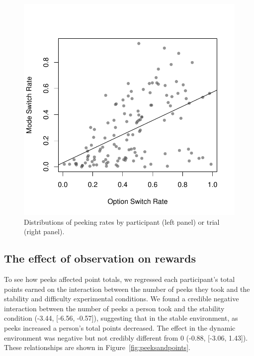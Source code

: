 \documentclass[a4paper,doc,natbib,floatsintext]{apa6}\usepackage[]{graphicx}\usepackage[]{color}
\makeatletter
\def\maxwidth{ %
  \ifdim\Gin@nat@width>\linewidth
    \linewidth
  \else
    \Gin@nat@width
  \fi
}
\newenvironment{knitrout}{}{} %
\makeatother
\begin{document}
\begin{figure}
\centering
\begin{knitrout}
\color{fgcolor}
\includegraphics[width=\maxwidth]{figure/unnamed-chunk-18-1} 

\end{knitrout}
\caption{\label{fig:switchingcor}Distributions of peeking rates by participant (left panel) or trial (right panel).}
\end{figure}

\subsection{The effect of observation on rewards}




To see how peeks affected point totals, we regressed each participant's total points earned on the interaction between the number of peeks they took and the stability and difficulty experimental conditions. We found a credible negative interaction between the number of peeks a person took and the stability condition (-3.44, [-6.56, -0.57]), suggesting that in the stable environment, as peeks increased a person's total points decreased. The effect in the dynamic environment was negative but not credibly different from 0 (-0.88, [-3.06, 1.43]). These relationships are shown in Figure~\ref{fig:peeksandpoints}.
\end{document}
